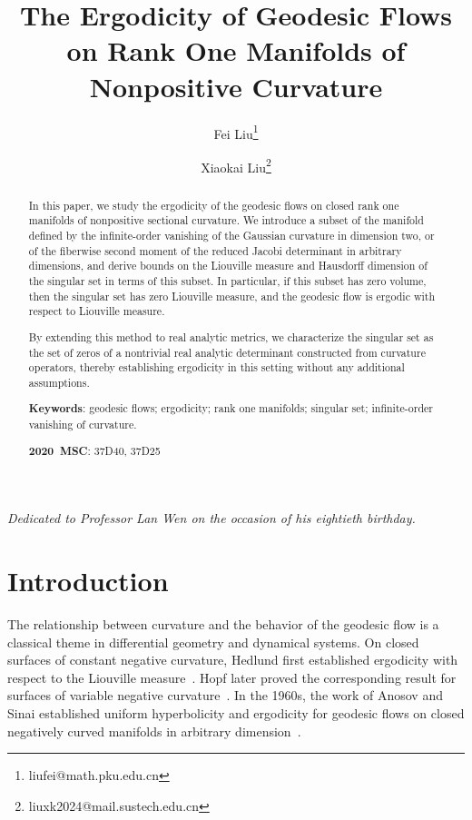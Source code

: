 \documentclass[reqno,11pt]{article}
\title{The Ergodicity of Geodesic Flows on Rank One Manifolds of Nonpositive Curvature}
\author[1]{Fei Liu\thanks{liufei@math.pku.edu.cn}}
\affil[1]{\small College of Mathematics and Systems Science, Shandong University of Science and Technology, Qingdao, 266590, China}
\author[2]{Xiaokai Liu\thanks{liuxk2024@mail.sustech.edu.cn}}
\affil[2]{\small Department of Mathematics, Southern University of Science and Technology, Shenzhen, 518055, China}
\theoremstyle{definition}
\theoremstyle{remark}
\numberwithin{equation}{section}
\begin{document}
\maketitle
\begin{center}
	\textit{Dedicated to Professor Lan Wen on the occasion of his eightieth birthday.}
\end{center}
\vspace{0.5em}

\begin{abstract}
	In this paper, we study the ergodicity of the geodesic flows on closed rank one manifolds of nonpositive sectional curvature. We introduce a subset of the manifold defined by the infinite-order vanishing of the Gaussian curvature in dimension two, or of the fiberwise second moment of the reduced Jacobi determinant in arbitrary dimensions, and derive bounds on the Liouville measure and Hausdorff dimension of the singular set in terms of this subset. In particular, if this subset has zero volume, then the singular set has zero Liouville measure, and the geodesic flow is ergodic with respect to Liouville measure. 

    By extending this method to real analytic metrics, we characterize the singular set as the set of zeros of a nontrivial real analytic determinant constructed from curvature operators, thereby establishing ergodicity in this setting without any additional assumptions.

	\textbf{Keywords}: geodesic flows; ergodicity; rank one manifolds; singular set; infinite-order vanishing of curvature.

	\textbf{2020~MSC}: 37D40, 37D25
\end{abstract}

\section{Introduction}
The relationship between curvature and the behavior of the geodesic flow is a classical theme in differential geometry and dynamical systems. On closed surfaces of constant negative curvature, Hedlund first established ergodicity with respect to the Liouville measure~\cite{Hedlund1934}. Hopf later proved the corresponding result for surfaces of variable negative curvature~\cite{Hopf1939}. In the 1960s, the work of Anosov and Sinai established uniform hyperbolicity and ergodicity for geodesic flows on closed negatively curved manifolds in arbitrary dimension~\cite{Anosov1967, AnosovSinai1967}.
\end{document}
